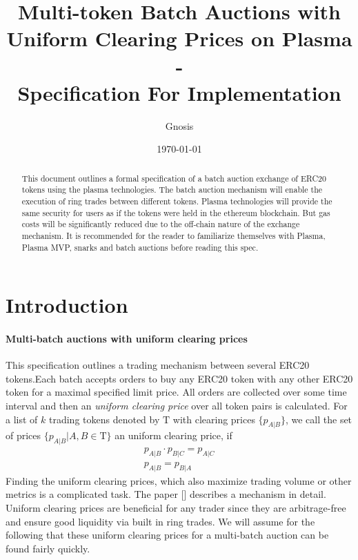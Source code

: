 \documentclass[11pt,parskip=full]{scrartcl}%
\title{
  Multi-token Batch Auctions with Uniform Clearing Prices on Plasma\\
  - \\
  \Large Specification For Implementation}
\author{Gnosis}
\date{\today}
\newcommand{\Tau}{\mathrm{T}}
\newcommand*{\erc}{ERC20 }
\begin{document}
\maketitle


\begin{abstract}

This document outlines a formal specification of a batch auction exchange of ERC20 tokens using the plasma technologies. 
The batch auction mechanism will enable the execution of ring trades between different tokens. 
Plasma technologies will provide the same security for users as if the tokens were held in the ethereum blockchain. 
But gas costs will be significantly reduced due to the off-chain nature of the exchange mechanism. 
It is recommended for the reader to familiarize themselves with Plasma\cite{plasma}, Plasma MVP\cite{MVP}, snarks\cite{snarks} and batch auctions\cite{batch} before reading this spec. 

\end{abstract}

\tableofcontents

\newpage
\section{Introduction}
\label{sec:introduction}

\paragraph{Multi-batch auctions with uniform clearing prices}

This specification outlines a trading mechanism between several ERC20 tokens.Each batch accepts orders to buy any \erc token with any other \erc token for a maximal specified limit price. 
All orders are collected over some time interval and then an \emph{uniform clearing price} over all token pairs is calculated. 
For a list of $k$ trading tokens denoted by $\Tau$ with clearing prices $\{p_{A|B}\}$, we call the set of prices $\{p_{A|B}| A,B \in \Tau \}$ an uniform clearing price, if
\begin{align}
  p_{A|B} \cdot p_{B|C} = p_{A|C}\\
  p_{A|B} = p_{B|A}
\end{align}
Finding the uniform clearing prices, which also maximize trading volume or other metrics is a complicated task. 
The paper [] describes a mechanism in detail. 
Uniform clearing prices are beneficial for any trader since they are arbitrage-free and ensure good liquidity via built in ring trades. 
We will assume for the following that these uniform clearing prices for a multi-batch auction can be found fairly quickly. 
\end{document}
